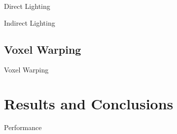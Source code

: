 \documentclass[10pt]{beamer}
\begin{document}
\begin{frame}{Direct Lighting}
\end{frame}

\begin{frame}{Indirect Lighting}
\end{frame}

\subsection{Voxel Warping}
\begin{frame}{Voxel Warping}
\end{frame}


\section{Results and Conclusions}


\begin{frame}{Performance}
\end{frame}
\end{document}
